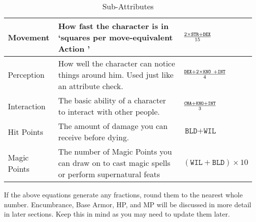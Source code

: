 \documentclass[twoside]{book}
\begin{document}
\begin{table}[htb]
\begin{center}
\begin{tabular}{|p{1in}|p{3in}|p{1.5in}|}
\hline

 Movement & How fast the character is in `squares
                     per move-equivalent Action ' &  \begin{math}  {{ 2  \times 
                     \texttt{STR} + \texttt{DEX}}\over{ 15 }}  \end{math}
                  \\

\hline

 Perception & How well the character can notice things
                     around him. Used just like an attribute check.
                     &  \begin{math}  {{  \texttt{DEX} +
                        2  \times    \texttt{KNO
                    } +   \texttt{INT}  }\over{ 4
                     }}  \end{math}
                  \\

\hline

 Interaction & The basic ability of a character to interact
                     with other people. &  \begin{math}  {{\texttt{CHA} +
                     \texttt{KNO} + \texttt{INT}}\over{ 3 }}  \end{math}
                  \\

\hline

 Hit Points & The amount of damage you can receive before
                     dying. &  \begin{math}\texttt{BLD} + \texttt{WIL
                    }\end{math}
                  \\

\hline

 Magic Points & The number of Magic Points you can draw on to
                     cast magic spells or perform supernatural feats
                     &  \begin{math}     (   \texttt{WIL} 
                      +   \texttt{BLD}   )   
                     \times     10     \end{math}
                  \\

\hline


  \end{tabular}
  
\caption{Sub-Attributes}
  
  \end{center}
\end{table}
   If the above equations generate any fractions, round
               them to the nearest whole number.  Encumbrance, Base Armor, HP, and MP will be
               discussed in more detail in later sections. Keep this in
               mind as you may need to update them later. 
    
\end{document}

